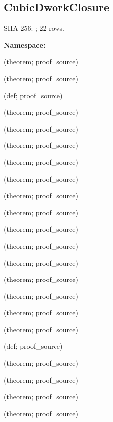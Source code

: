 \subsection*{CubicDworkClosure}
{\footnotesize SHA-256: ; 22 rows.}\par
\begingroup\small
\textbf{Namespace:} \par
\noindent{} {\scriptsize (theorem; proof\_source)}\par
\noindent{} {\scriptsize (theorem; proof\_source)}\par
\noindent{} {\scriptsize (def; proof\_source)}\par
\noindent{} {\scriptsize (theorem; proof\_source)}\par
\noindent{} {\scriptsize (theorem; proof\_source)}\par
\noindent{} {\scriptsize (theorem; proof\_source)}\par
\noindent{} {\scriptsize (theorem; proof\_source)}\par
\noindent{} {\scriptsize (theorem; proof\_source)}\par
\noindent{} {\scriptsize (theorem; proof\_source)}\par
\noindent{} {\scriptsize (theorem; proof\_source)}\par
\noindent{} {\scriptsize (theorem; proof\_source)}\par
\noindent{} {\scriptsize (theorem; proof\_source)}\par
\noindent{} {\scriptsize (theorem; proof\_source)}\par
\noindent{} {\scriptsize (theorem; proof\_source)}\par
\noindent{} {\scriptsize (theorem; proof\_source)}\par
\noindent{} {\scriptsize (theorem; proof\_source)}\par
\noindent{} {\scriptsize (theorem; proof\_source)}\par
\noindent{} {\scriptsize (def; proof\_source)}\par
\noindent{} {\scriptsize (theorem; proof\_source)}\par
\noindent{} {\scriptsize (theorem; proof\_source)}\par
\noindent{} {\scriptsize (theorem; proof\_source)}\par
\noindent{} {\scriptsize (theorem; proof\_source)}\par
\endgroup
